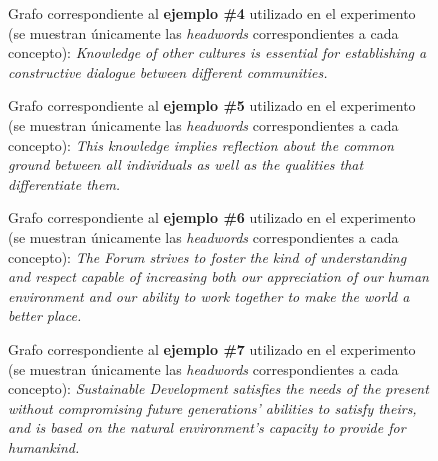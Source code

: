 \documentclass[a4paper,12pt,spanish]{book}
\begin{document}
\begin{figure}[htbp]
\centering
\capstart

\caption[Grafo correspondiente a la oración original del ejemplo \#4 utilizado en el experimento.]{Grafo correspondiente al \textbf{ejemplo \#4} utilizado en el experimento (se muestran
únicamente las \emph{headwords} correspondientes a cada concepto): \emph{Knowledge of
other cultures is essential for establishing a constructive dialogue between
different communities.}}\label{appendix-data:sample04-original}\end{figure}
\begin{figure}[htbp]
\centering
\capstart

\caption[Grafo correspondiente a la oración original del ejemplo \#5 utilizado en el experimento.]{Grafo correspondiente al \textbf{ejemplo \#5} utilizado en el experimento (se muestran
únicamente las \emph{headwords} correspondientes a cada concepto): \emph{This knowledge
implies reflection about the common ground between all individuals as well as
the qualities that differentiate them.}}\label{appendix-data:sample05-original}\end{figure}
\begin{figure}[htbp]
\centering
\capstart

\caption[Grafo correspondiente a la oración original del ejemplo \#6 utilizado en el experimento.]{Grafo correspondiente al \textbf{ejemplo \#6} utilizado en el experimento (se muestran
únicamente las \emph{headwords} correspondientes a cada concepto): \emph{The Forum
strives to foster the kind of understanding and respect capable of increasing
both our appreciation of our human environment and our ability to work together
to make the world a better place.}}\label{appendix-data:sample06-original}\end{figure}
\begin{figure}[htbp]
\centering
\capstart

\caption[Grafo correspondiente a la oración original del ejemplo \#7 utilizado en el experimento.]{Grafo correspondiente al \textbf{ejemplo \#7} utilizado en el experimento (se muestran
únicamente las \emph{headwords} correspondientes a cada concepto): \emph{Sustainable
Development satisfies the needs of the present without compromising future
generations' abilities to satisfy theirs, and is based on the natural
environment's capacity to provide for humankind.}}\label{appendix-data:sample07-original}\end{figure}
\end{document}
